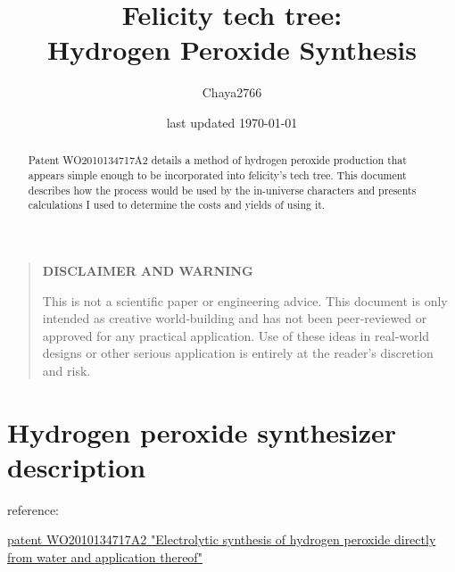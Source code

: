 \documentclass[a4paper]{article}
\title{Felicity tech tree:\\Hydrogen Peroxide Synthesis}
\author{Chaya2766}
\date{last updated \today}
\begin{document}
	\sffamily
	\hyphenchar{}
	\sloppy
	
	\maketitle
	
	\begin{center}
	\end{center}
	
	\textbf{
		\sloppy
		\hyphenchar{}
		}
	
	\vfill
	
	\begin{abstract}
		Patent WO2010134717A2 details a method of hydrogen peroxide production that appears simple enough to be incorporated into felicity's tech tree.
		This document describes how the process would be used by the in-universe characters and presents calculations I used to determine the costs and yields of using it.
	\end{abstract}
	
	\vfill
	
	\begin{quote}
		\begin{center}
			\textbf{DISCLAIMER AND WARNING}
		\end{center}
		
		This is not a scientific paper or engineering advice.
		This document is only intended as creative world‑building and has not been peer‑reviewed or approved for any practical application.
		Use of these ideas in real‑world designs or other serious application is entirely at the reader’s discretion and risk.
	\end{quote}
	
	\vfill
	
	\tableofcontents
	
	\pagebreak
	
	\section{Hydrogen peroxide synthesizer description}
	
	{
		\small reference:
		
		\href{https://patentimages.storage.googleapis.com/13/4d/99/dfbb875f401486/WO2010134717A2.pdf}{patent WO2010134717A2 "Electrolytic synthesis of hydrogen peroxide directly from water and application thereof"}
	}
	
\end{document}
